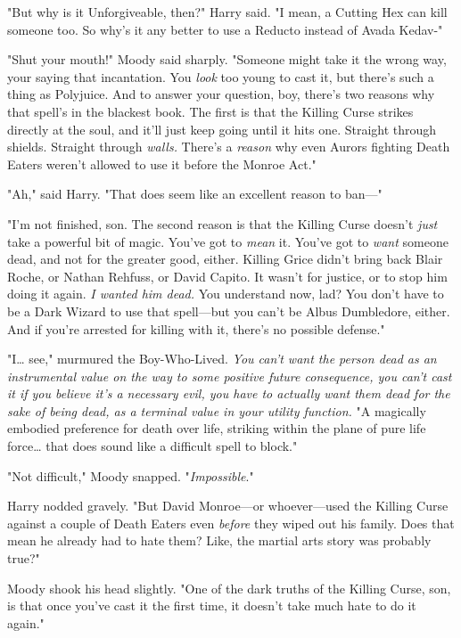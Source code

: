 "But why is it Unforgiveable, then?" Harry said. "I mean, a Cutting Hex can kill someone too. So why's it any better to use a Reducto instead of Avada Kedav-"

"Shut your mouth!" Moody said sharply. "Someone might take it the wrong way, your saying that incantation. You \emph{look} too young to cast it, but there's such a thing as Polyjuice. And to answer your question, boy, there's two reasons why that spell's in the blackest book. The first is that the Killing Curse strikes directly at the soul, and it'll just keep going until it hits one. Straight through shields. Straight through \emph{walls.} There's a \emph{reason} why even Aurors fighting Death Eaters weren't allowed to use it before the Monroe Act."

"Ah," said Harry. "That does seem like an excellent reason to ban---"

"I'm not finished, son. The second reason is that the Killing Curse doesn't \emph{just} take a powerful bit of magic. You've got to \emph{mean} it. You've got to \emph{want} someone dead, and not for the greater good, either. Killing Grice didn't bring back Blair Roche, or Nathan Rehfuss, or David Capito. It wasn't for justice, or to stop him doing it again. \emph{I wanted him dead.} You understand now, lad? You don't have to be a Dark Wizard to use that spell---but you can't be Albus Dumbledore, either. And if you're arrested for killing with it, there's no possible defense."

"I{\ldots} see," murmured the Boy-Who-Lived. \emph{You can't want the person dead as an instrumental value on the way to some positive future consequence, you can't cast it if you believe it's a necessary evil, you have to actually want them dead for the sake of being dead, as a terminal value in your utility function.} "A magically embodied preference for death over life, striking within the plane of pure life force{\ldots} that does sound like a difficult spell to block."

"Not difficult," Moody snapped. "\emph{Impossible}."

Harry nodded gravely. "But David Monroe---or whoever---used the Killing Curse against a couple of Death Eaters even \emph{before} they wiped out his family. Does that mean he already had to hate them? Like, the martial arts story was probably true?"

Moody shook his head slightly. "One of the dark truths of the Killing Curse, son, is that once you've cast it the first time, it doesn't take much hate to do it again."

